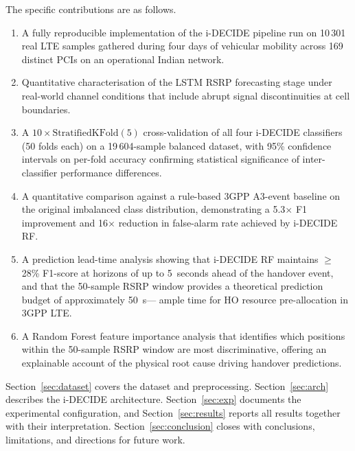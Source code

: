 \documentclass[journal]{IEEEtran}
\begin{document}
The specific contributions are as follows.
\begin{enumerate}
  \item A fully reproducible implementation of the i-DECIDE pipeline
  run on 10\,301 real LTE samples gathered during four days of vehicular
  mobility across 169 distinct PCIs on an operational Indian network.

  \item Quantitative characterisation of the LSTM RSRP forecasting stage
  under real-world channel conditions that include abrupt signal
  discontinuities at cell boundaries.

  \item A $10\times\text{StratifiedKFold}(5)$ cross-validation
  of all four i-DECIDE classifiers (50 folds each) on a
  19\,604-sample balanced dataset, with 95\% confidence intervals on
  per-fold accuracy confirming statistical significance of
  inter-classifier performance differences.

  \item A quantitative comparison against a rule-based 3GPP A3-event
  baseline on the original imbalanced class distribution, demonstrating
  a 5.3$\times$ F1 improvement and 16$\times$ reduction in false-alarm
  rate achieved by i-DECIDE RF.

  \item A prediction lead-time analysis showing that i-DECIDE RF
  maintains $\geq$28\% F1-score at horizons of up to 5~seconds ahead
  of the handover event, and that the 50-sample RSRP window provides
  a theoretical prediction budget of approximately \SI{50}{\second}---
  ample time for HO resource pre-allocation in 3GPP LTE.

  \item A Random Forest feature importance analysis that identifies
  which positions within the 50-sample RSRP window are most
  discriminative, offering an explainable account of the physical
  root cause driving handover predictions.
\end{enumerate}

Section~\ref{sec:dataset} covers the dataset and preprocessing.
Section~\ref{sec:arch} describes the i-DECIDE architecture.
Section~\ref{sec:exp} documents the experimental configuration,
and Section~\ref{sec:results} reports all results together with
their interpretation. Section~\ref{sec:conclusion} closes with
conclusions, limitations, and directions for future work.

\end{document}
